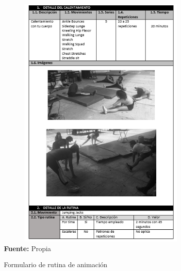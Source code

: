 \begin{figure}[H]
	\caption{Formulario de rutina de animaci\'on}
	\label{fig:frmRoutCher}
	\centering	\includegraphics[width=400px,height=490px]{graphics/resultados/rutina-cheerleaders.PNG} \\
	\textbf{Fuente:} Propia
\end{figure}
